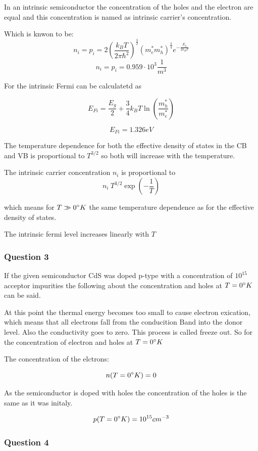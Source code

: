 In an intrinsic semiconductor the concentration of the holes and the 
electron are equal and this concentration is named as
intrinsic carrier's concentration. 

Which is knwon to be:
$$n_i = p_i = 2 \left( \frac{k_BT}{2\pi\hbar^2} \right)^{\frac{3}{2}}
  (m_e^*m_h^*)^{\frac{3}{4}} e^{-\frac{E_g}{2k_BT}}$$
$$n_i = p_i = 0.959 \cdot 10^3 \frac{1}{m^3}$$

For the intrinsic Fermi can be calculatetd as 

$$E_{Fi} = \frac{E_g}{2} + \frac{3}{4} k_B T \ln\left( \frac{m_h^*}{m_e^*} \right)$$

$$E_{Fi} = 1.326 eV$$

The temperature dependence for both the effective density
of states in the CB and VB is proportional to $T^{3/2}$ so
both will increase with the temperature.

The intrinsic carrier concentration $n_i$ is proportional to
$$n_i ~ T^{3/2} \exp(-\frac{1}{T})$$

which means for $T \gg 0 \degree K$ the same temperature dependence as for the effective density of states.

The intrinsic fermi level increases linearly with $T$


\subsubsection*{Question 3}

If the given semiconductor CdS was doped p-type with a
concentration of $10^{15}$ acceptor impurities the following
about the concentration and holes at $T=0\degree K$ can be said.

At this point the thermal energy becomes too small to cause electron exication, which means that all electrons fall from
the conducition Band into the donor level. Also the conductivity
goes to zero. This process is called freeze out. 
So for the concentration of electron and holes at $T=0 \degree K$

The concentration of the elctrons:

$$n(T=0 \degree K) = 0$$

As the semiconductor is doped with holes the concentration of the
holes is the same as it was initaly.

$$p(T=0 \degree K) = 10^{15}cm^{-3}$$


\subsubsection*{Question 4}


